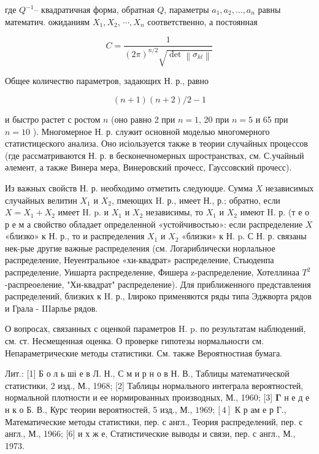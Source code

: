 \documentclass[10pt]{article}
\begin{document}
где $Q^{-1}$-- квадратичная форма, обратная $Q$, параметры $a_{1}, a_{2}, \ldots, a_{n}$ равны математич. ожиданиям $X_{1}, X_{2}$, $\cdots, X_{n}$ соответственно, а постоянная



\[

C=\frac{1}{(2 \pi)^{n / 2} \sqrt{\operatorname{det}\left\|\sigma_{k l}\right\|}}

\]



Общее количество параметров, задающих Н. р., равно



\[

(n+1)(n+2) / 2-1

\]



и быстро растет с ростом $n$ (оно равно 2 при $n=1$, 20 при $n=5$ и 65 при $n=10$ ). Многомерное Н. р. служит основной моделью многомерного статистицеского анализа. Оно исіользуется также в теории случайных процессов (где рассматриваются Н. р. в бесконечномерных шространствах, см. С.учайный әлемент, а также Винера мера, Винеровский прочесс, Гауссовский прочесс).



Из важных свойств Н. р. необходимо отметить следуюџџе. Сумма $X$ независимых случайных велитин $X_{1}$ и $X_{2}$, пмеющих H. р., имеет Н., р.; обратно, если $X=X_{1}+X_{2}$ имеет H. p. и $X_{1}$ и $X_{2}$ независимы, то $X_{1}$ и $X_{2}$ имеют H. р. (т е о р е м а свойство обладает определенной «устойчивостью»: если распределение $X$ «близко» к Н. р., то и распределения $X_{1}$ и $X_{2}$ «близки» к Н. p. С Н. р. связаны нек-рые другие важные распределения (см. Логариблически норлальное распределение, Неуентральное «хи-квадрат» распределение, Стьюденпа распределение, Уишарта распределение, Фишера z-распределение, Хотеллинаа $T^{2}$-распреоеление, "Хи-квадрат" распределение). Для приближенного представления распределений, близких к H. р., Ілироко применяются ряды типа Эджворта рядов и Грала - IIIарлье рядов.



О вопросах, связанных с оценкой параметров H. p. по результатам наблюдений, см. ст. Несмещенная оценка. О проверке гипотезы нормальносги см. Непараметрические методы статистики. См. также Вероятностиая бумага.



Лит.: [1] Б о л ь ші е в Л. Н., С м и р н о в Н. В., Таблицы математической статистики, 2 изд., М., 1968; [2] Таблицы нормального интеграла вероятностей, нормальной плотности и ее нормированных производных, М., 1960; [3] $\boldsymbol{\Gamma}$ н е д е н к о Б. В., Курс теории вероятностей, 5 изд., М., $1969 ;[4]$ К р ам е р Г., Математические методы статистики, пер. с англ., Теория распределений, пер. с англ., М., 1966; [6] и х ж е, Статистические выводы и связи, пер. с англ., М., 1973.
\end{document}
